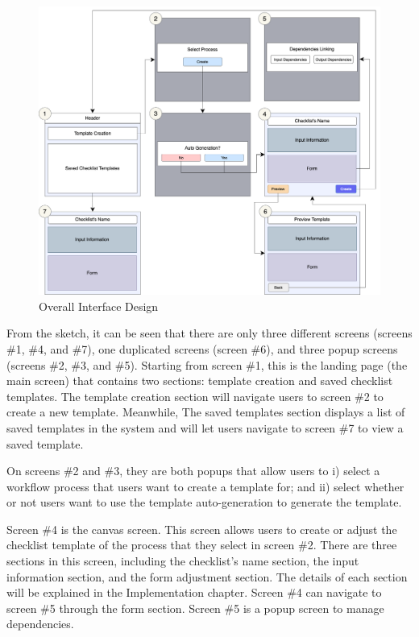\begin{figure}[ht!]
    \centering
    \includegraphics[width=\textwidth]{overleaf/images/overall_interface_design.png}
    \caption{Overall Interface Design}
    \label{fig:overall_interface_design}
\end{figure}

From the sketch, it can be seen that there are only three different screens (screens \#1, \#4, and \#7), one duplicated screens (screen \#6), and three popup screens (screens \#2, \#3, and \#5). Starting from screen \#1, this is the landing page (the main screen) that contains two sections: template creation and saved checklist templates. The template creation section will navigate users to screen \#2 to create a new template. Meanwhile, The saved templates section displays a list of saved templates in the system and will let users navigate to screen \#7 to view a saved template.

On screens \#2 and \#3, they are both popups that allow users to i) select a workflow process that users want to create a template for; and ii) select whether or not users want to use the template auto-generation to generate the template.

Screen \#4 is the canvas screen. This screen allows users to create or adjust the checklist template of the process that they select in screen \#2. There are three sections in this screen, including the checklist's name section, the input information section, and the form adjustment section. The details of each section will be explained in the Implementation chapter.
Screen \#4 can navigate to screen \#5 through the form section. Screen \#5 is a popup screen to manage dependencies.

